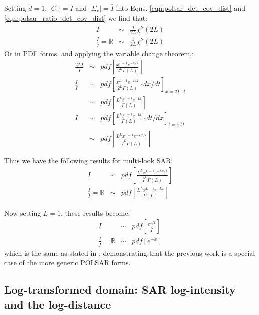 \documentclass[journal,12pt,draftcls,onecolumn]{IEEEtran}
\begin{document}
Setting $d=1$, $|C_v|=I$ and $|\Sigma_v|=\bar{I}$ into Eqns. \ref{eqn:polsar_det_cov_dist} and \ref{eqn:polsar_ratio_det_cov_dist}
we find that:
\begin{eqnarray*}
  I &\sim& \frac{\bar{I}}{2L} \chi^2(2L)  \\
  \frac{I}{\bar{I}} = \mathbb{R} &\sim& \frac{1}{2L}  \chi^2(2L)   
\end{eqnarray*}
Or in PDF forms, and applying the variable change theorem,:
\begin{eqnarray*}
    \frac{2L I}{\bar{I}} &\sim& pdf \left[ \frac{x^{L-1}e^{-x/2}}{2^L \Gamma(L)} \right] \\
  \frac{I}{\bar{I}} &\sim& pdf \left[ \frac{x^{L-1}e^{-x/2}}{2^L \Gamma(L)} \cdot dx/dt \right]_{x=2L \cdot t} \\
    &\sim& pdf \left[ \frac{ L^{L} t^{L-1} e^{-Lt}}{ \Gamma(L)} \right] \\
  I &\sim& pdf \left[ \frac{ L^{L} t^{L-1} e^{-Lt}}{ \Gamma(L)} \cdot dt/dx \right]_{t=x/\bar{I}}  \\
    &\sim& pdf \left[ \frac{ L^{L} x^{L-1} e^{-Lx/\bar{I}}}{ \bar{I}^{L}\Gamma(L)} \right]
\end{eqnarray*}

Thus we have the following results for multi-look SAR:
\begin{eqnarray}
    I &\sim& pdf \left[ \frac{ L^{L} x^{L-1} e^{-Lx/\bar{x}}}{ \bar{I}^{L}\Gamma(L)} \right] \label{eqn:multi_look_SAR_intensity_dist} \\
    \frac{I}{\bar{I}} = \mathbb{R} &\sim& pdf \left[ \frac{ L^{L} x^{L-1} e^{-Lx}}{ \Gamma(L)} \label{eqn:multi_look_SAR_ratio_dist} \right] 
\end{eqnarray}

Now setting $L=1$, these results become:
\begin{eqnarray}
    I &\sim& pdf \left[ \frac{ e^{x/\bar{I}}}{ \bar{I}} \right] \\
    \frac{I}{\bar{I}} = \mathbb{R} &\sim& pdf \left[ e^{-x} \right] 
\end{eqnarray}
which is the same as stated in \cite{Le_2010_ACRS}, demonstrating that the previous work is a special case of the more generic POLSAR forms.

\subsection{Log-transformed domain: SAR log-intensity and the log-distance}
\end{document}
